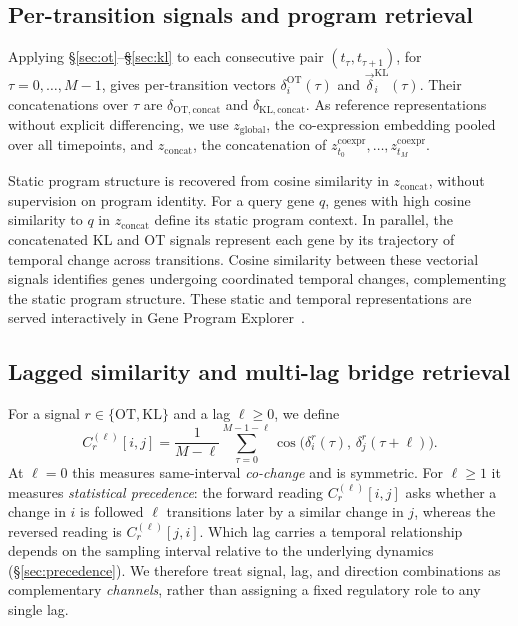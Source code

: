 \documentclass[10pt, letterpaper]{article}
\DeclareRobustCommand{\eliasremoves}[1]{{\color{red}\sout{#1}}}
\newcommand{\zco}{z^{\mathrm{coexpr}}}
\newcommand{\dOT}{\delta^{\mathrm{OT}}}
\newcommand{\vKL}{\vec{\delta}^{\mathrm{KL}}}
\begin{document}
\subsection{Per-transition signals and program retrieval}
\label{sec:vectorial}

Applying \S\ref{sec:ot}--\eliasremoves{\S}\ref{sec:kl} to each consecutive pair $(t_\tau,t_{\tau+1})$, for $\tau=0,\dots,M-1$, gives per-transition vectors $\dOT_i(\tau)$ and $\vKL_i(\tau)$. Their concatenations over $\tau$ are $\delta_{\mathrm{OT,concat}}$ and $\delta_{\mathrm{KL,concat}}$. As reference representations without explicit differencing, we use $z_{\mathrm{global}}$, the co-expression embedding pooled over all timepoints, and $z_{\mathrm{concat}}$, the concatenation of $\zco_{t_0},\dots,\zco_{t_M}$.

Static program structure is recovered from cosine similarity in $z_{\mathrm{concat}}$, without supervision on program identity. For a query gene $q$, genes with high cosine similarity to $q$ in $z_{\mathrm{concat}}$ define its static program context. In parallel, the concatenated KL and OT signals represent each gene by its trajectory of temporal change across transitions. Cosine similarity between these vectorial signals identifies genes undergoing coordinated temporal changes, complementing the static program structure. These static and temporal representations are served interactively in Gene Program Explorer~\cite{rmsexplorer2026}.

\subsection{Lagged similarity and multi-lag bridge retrieval}
\label{sec:bridge}

For a signal $r\in\{\mathrm{OT},\mathrm{KL}\}$ and a lag $\ell\ge 0$, we define
\[
C_r^{(\ell)}[i,j]=\frac{1}{M-\ell}\sum_{\tau=0}^{M-1-\ell}\cos\!\big(\delta_i^r(\tau),\,\delta_j^r(\tau+\ell)\big).
\]
At $\ell=0$ this measures same-interval \emph{co-change} and is symmetric. For $\ell\ge1$ it measures \emph{statistical precedence}: the forward reading $C_r^{(\ell)}[i,j]$ asks whether a change in $i$ is followed $\ell$ transitions later by a similar change in $j$, whereas the reversed reading is $C_r^{(\ell)}[j,i]$. Which lag carries a temporal relationship depends on the sampling interval relative to the underlying dynamics (\S\ref{sec:precedence}). We therefore treat signal, lag, and direction combinations as complementary \emph{channels}, rather than assigning a fixed regulatory role to any single lag.
\end{document}
